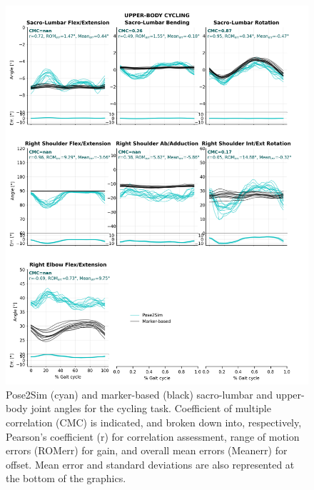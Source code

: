 \begin{figure}[!ht]
	\centering
	\def\svgwidth{1\columnwidth}
	\fontsize{10pt}{10pt}\selectfont
	\includegraphics[height=\dimexpr\textheight-119pt]{"../Annexes/Figures/Fig_QTMBikeUp.png"}
	\caption{Pose2Sim (cyan) and marker-based (black) sacro-lumbar and upper-body joint angles for the cycling task. Coefficient of multiple correlation (CMC) is indicated, and broken down into, respectively, Pearson’s coefficient (r) for correlation assessment, range of motion errors (ROMerr) for gain, and overall mean errors (Meanerr) for offset. Mean error and standard deviations are also represented at the bottom of the graphics.}
	\label{fig_qtmbikeup}
\end{figure}

